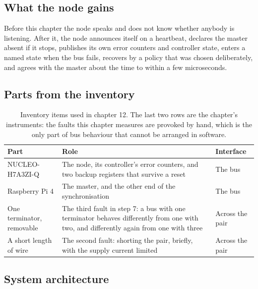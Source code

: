 \subsection*{What the node gains}

Before this chapter the node speaks and does not know whether anybody is
listening. After it, the node announces itself on a heartbeat, declares the
master absent if it stops, publishes its own error counters and controller
state, enters a named state when the bus fails, recovers by a policy that was
chosen deliberately, and agrees with the master about the time to within a few
microseconds.

\subsection*{Parts from the inventory}

\begin{table}[H]\centering\small
\begin{tabular}{p{40mm}p{66mm}p{40mm}}
\toprule
Part & Role & Interface \\
\midrule
NUCLEO-H7A3ZI-Q & The node, its controller's error counters, and two backup registers that survive a reset & The bus \\
Raspberry Pi 4 & The master, and the other end of the synchronisation & The bus \\
One terminator, removable & The third fault in step 7: a bus with one terminator behaves differently from one with two, and differently again from one with three & Across the pair \\
A short length of wire & The second fault: shorting the pair, briefly, with the supply current limited & Across the pair \\
\bottomrule
\end{tabular}
\caption{Inventory items used in chapter 12. The last two rows are the chapter's instruments: the faults this chapter measures are provoked by hand, which is the only part of bus behaviour that cannot be arranged in software.}
\end{table}

\subsection*{System architecture}


